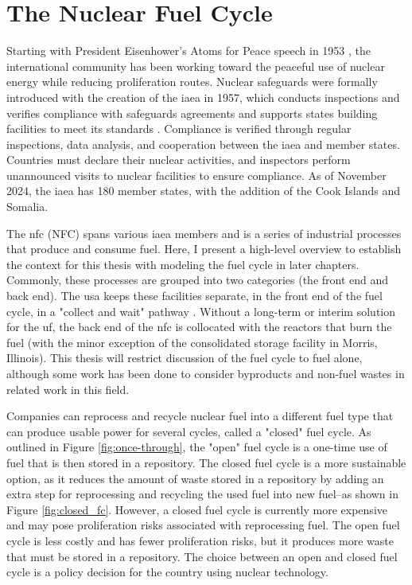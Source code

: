 \section{The Nuclear Fuel Cycle}
\label{sec:nfc}

Starting with President Eisenhower's Atoms for Peace speech in 1953
\cite{atoms_for_peace}, the international community has been working toward the peaceful use of nuclear energy while reducing proliferation routes. Nuclear safeguards were formally introduced with the creation of the \gls{iaea} in 1957, which conducts inspections and verifies compliance with safeguards agreements and supports states building facilities to meet its standards \cite{member_states}. Compliance is verified through regular inspections, data analysis, and cooperation between the \gls{iaea} and member states. Countries must declare their nuclear activities, and inspectors perform unannounced visits to nuclear facilities to ensure compliance. As of November 2024, the \gls{iaea} has 180 member states, with the addition of the Cook Islands and Somalia.

The \acrlong{nfc} (NFC) spans various \gls{iaea} members and is a series of industrial processes that produce and consume fuel. Here, I present a high-level overview to establish the context for this thesis with modeling the fuel cycle in later chapters. Commonly, these processes are grouped into two categories (the front end and back end). The \gls{usa} keeps these facilities separate, in the front end of the fuel cycle, in a "collect and wait" pathway \cite{cycle_risks}. Without a long-term or interim solution for the \gls{uf}, the back end of the \gls{nfc} is collocated with the reactors that burn the fuel (with the minor exception of the consolidated storage facility in Morris, Illinois). This thesis will restrict discussion of the fuel cycle to fuel alone, although some work has been done to consider byproducts and non-fuel wastes in related work in this field.

Companies can reprocess and recycle nuclear fuel into a different fuel type
that can produce usable power for several cycles, called a "closed" fuel cycle.
As outlined in Figure \ref{fig:once-through}, the "open" fuel cycle is a
one-time use of fuel that is then stored in a repository. The closed fuel cycle
is a more sustainable option, as it reduces the amount of waste stored in a
repository by adding an extra step for reprocessing and recycling the used fuel
into new fuel--as shown in Figure \ref{fig:closed_fc}. However, a closed fuel
cycle is currently more expensive and may pose proliferation risks associated with reprocessing fuel. The open fuel cycle is less costly and has fewer
proliferation risks, but it produces more waste that must be stored in a
repository. The choice between an open and closed fuel cycle is a policy decision for the country using nuclear technology.

